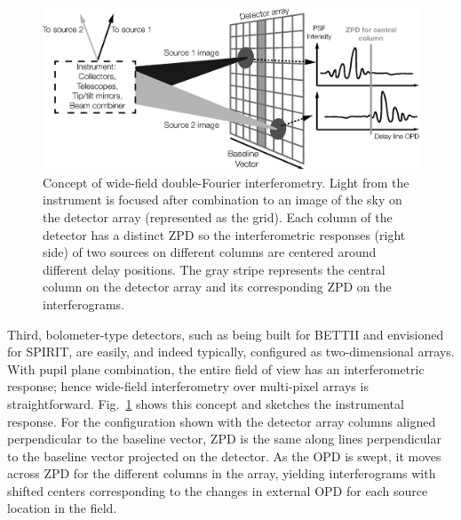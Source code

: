 \begin{figure}[ht!]
\begin{center}
\includegraphics[width=\textwidth]{Figures/f1.eps}
\caption[WideField]{Concept of wide-field double-Fourier interferometry. Light from the instrument is focused after combination to an image of the sky on the detector array (represented as the grid). Each column of the detector has a distinct ZPD so the interferometric responses (right side) of two sources on different columns are centered around different delay positions. The gray stripe represents the central column on the detector array and its corresponding ZPD on the interferograms.}
\label{fig:widefield}
\end{center}
\end{figure}


Third, bolometer-type detectors, such as being built for BETTII and envisioned for SPIRIT, are
easily, and indeed typically, configured as two-dimensional arrays. With pupil plane combination,
the entire field of view has an interferometric response; hence wide-field interferometry over
multi-pixel arrays is straightforward. Fig.~\ref{fig:widefield} shows this concept and sketches the instrumental
response. For the configuration shown with the detector array columns aligned perpendicular
to the baseline vector, ZPD is the same along lines perpendicular to the baseline vector projected on the detector. As the OPD is swept, it moves across ZPD for the different columns in the array, yielding interferograms with shifted centers corresponding to the changes in external OPD for each source location in the field. 


